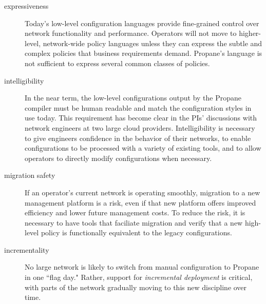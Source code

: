 \begin{description}
\item[expressiveness]  Today's low-level configuration languages provide fine-grained control over network functionality and performance.  Operators will not move to higher-level, network-wide policy languages unless they can express the subtle and complex policies that business requirements demand.  Propane's 
language is not sufficient to express several common classes of policies.

\item[intelligibility] In the near term, the low-level configurations output by the Propane compiler must be human readable and match the configuration styles in use today.  This requirement has become clear in the PIs' discussions with network engineers at two large cloud providers.  Intelligibility is necessary to give engineers confidence in the behavior of their networks, to enable configurations to be processed with a variety of existing tools, and to allow operators to directly modify configurations when necessary.  

\item[migration safety]  If an operator's current network is operating smoothly,
migration to a new management platform is a risk, even if that new platform
offers improved efficiency and lower future management costs.  To reduce the
risk, it is necessary to have tools that faciliate migration and verify that a new high-level policy is
functionally equivalent to the legacy configurations.

\item[incrementality] No large network is likely to switch from manual configuration to Propane in one ``flag day."   Rather, support for {\em incremental deployment} is critical, with parts of the network gradually moving to this new discipline over time.

\end{description}

